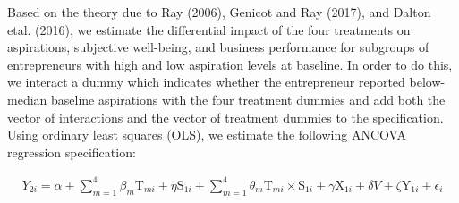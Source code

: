 \documentclass[11.5pt]{article}
\begin{document}


Based on the theory due to Ray (2006), Genicot and Ray (2017), and Dalton etal. (2016), we estimate the differential impact of the four treatments on aspirations, subjective well-being, and business performance for subgroups of entrepreneurs with high and low aspiration levels at baseline. In order to do this, we interact a dummy which indicates whether the entrepreneur reported below-median baseline aspirations with the four treatment dummies and add both the vector of interactions and the vector of treatment dummies to the specification. Using ordinary least squares (OLS), we estimate the following ANCOVA regression specification:

\begin{align}
    {Y}_{2i} = \alpha + \sum\limits_{m=1}^4 \beta_m \text{T}_{mi} + \eta \text{S}_{1i} + \sum\limits_{m=1}^4 \theta_m \text{T}_{mi} \times \text{S}_{1i} + \gamma \text{X}_{1i} + \delta {V} + \zeta \text{Y}_{1i} + \epsilon_i \label{eq:2}
\end{align}
\end{document}
